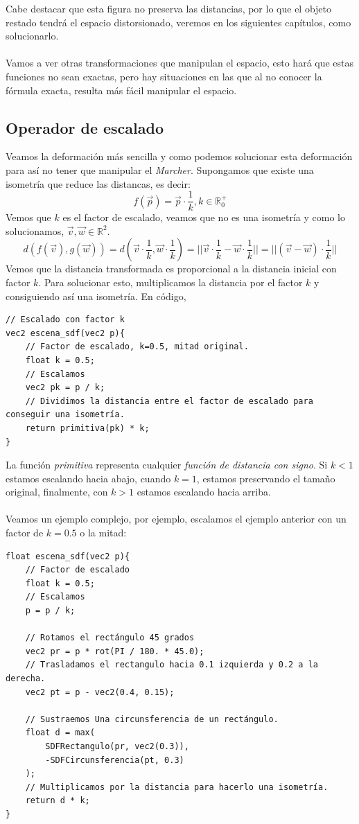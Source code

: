Cabe destacar que esta figura no preserva las distancias, por lo que el objeto restado tendrá el espacio distorsionado, veremos en los siguientes capítulos, como solucionarlo.\\\\ Vamos a ver otras transformaciones que manipulan el espacio, esto hará que estas funciones no sean exactas, pero hay situaciones en las que al no conocer la fórmula exacta, resulta más fácil manipular el espacio.

\subsection{Operador de escalado}
Veamos la deformación más sencilla y como podemos solucionar esta deformación para así no tener que manipular el \textit{Marcher}.
Supongamos que existe una isometría que reduce las distancas, es decir:
\[f(\Vec{p})=\Vec{p}\cdot \dfrac{1}{k}, k \in \mathbb{R}^{+}_{0}\]
Vemos que \(k\) es el factor de escalado, veamos que no es una isometría y como lo solucionamos, \(\Vec{v},\Vec{w}\in \mathbb{R}^2\).
\[d(f(\Vec{v}),g(\Vec{w}))=d(\Vec{v}\cdot \dfrac{1}{k}, \Vec{w}\cdot \dfrac{1}{k}) = \vert\vert \Vec{v}\cdot \dfrac{1}{k} - \Vec{w}\cdot \dfrac{1}{k}\vert\vert=\vert\vert (\Vec{v} - \Vec{w})\cdot \dfrac{1}{k}\vert\vert\]
Vemos que la distancia transformada es proporcional a la distancia inicial con factor \(k\). Para solucionar esto, multiplicamos la distancia por el factor \(k\) y consiguiendo así una isometría.
En código,

\begin{lstlisting}
// Escalado con factor k
vec2 escena_sdf(vec2 p){
    // Factor de escalado, k=0.5, mitad original. 
    float k = 0.5;
    // Escalamos
    vec2 pk = p / k; 
    // Dividimos la distancia entre el factor de escalado para conseguir una isometría.
    return primitiva(pk) * k;
}
\end{lstlisting}

La función \textit{primitiva} representa cualquier \textit{función de distancia con signo}. Si \(k<1\) estamos escalando hacia abajo, cuando \(k=1\), estamos preservando el tamaño original, finalmente, con \(k>1\) estamos escalando hacia arriba.\\\\
Veamos un ejemplo complejo, por ejemplo, escalamos el ejemplo anterior con un factor de \(k=0.5\) o la mitad:

\begin{lstlisting}
float escena_sdf(vec2 p){
    // Factor de escalado
    float k = 0.5;
    // Escalamos
    p = p / k;
    
    // Rotamos el rectángulo 45 grados
    vec2 pr = p * rot(PI / 180. * 45.0);
    // Trasladamos el rectangulo hacia 0.1 izquierda y 0.2 a la derecha.
    vec2 pt = p - vec2(0.4, 0.15);
    
    // Sustraemos Una circunsferencia de un rectángulo.
    float d = max(
        SDFRectangulo(pr, vec2(0.3)),
        -SDFCircunsferencia(pt, 0.3)
    );
    // Multiplicamos por la distancia para hacerlo una isometría.
    return d * k;
}
\end{lstlisting}

